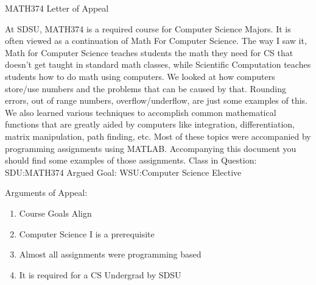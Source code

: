 \documentclass{article}
\begin{document}
\begin{center}
	MATH374 Letter of Appeal
\end{center}

At SDSU, MATH374 is a required course for Computer Science Majors. It is often viewed as a continuation of Math For Computer Science. The way I saw it, Math for Computer Science teaches students the math they need for CS that doesn't get taught in standard math classes, while Scientific Computation teaches students how to do math using computers. We looked at how computers store/use numbers and the problems that can be caused by that. Rounding errors, out of range numbers, overflow/underflow, are just some examples of this. We also learned various techniques to accomplish common mathematical functions that are greatly aided by computers like integration, differentiation, matrix manipulation, path finding, etc. Most of these topics were accompanied by programming assignments using MATLAB. Accompanying this document you should find some examples of those assignments.
\newline
Class in Question: SDU:MATH374
\newline
Argued Goal: WSU:Computer Science Elective

Arguments of Appeal:
\begin{enumerate}
	\item Course Goals Align
	\item Computer Science I is a prerequisite
	\item Almost all assignments were programming based
	\item It is required for a CS Undergrad by SDSU
\end{enumerate}

\end{document}
